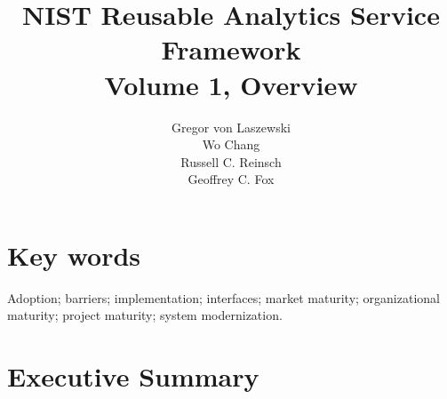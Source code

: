 \documentclass[12pt,fullpage]{article}
\newcommand{\TITLE}{NIST Reusable Analytics Service Framework\\
Volume 1, Overview}
\newcommand{\AUTHORS}{
\large Gregor von Laszewski\\
\large Wo Chang\\
\large Russell C. Reinsch\\
\large Geoffrey C. Fox\\
}
\begin{document}
% 

\title{\TITLE}
\author{\AUTHORS}
\maketitle






\section*{Key words}
\normalsize 

Adoption; barriers; implementation; interfaces; market maturity;
organizational maturity; project maturity; system modernization.\\

\pagebreak
\tableofcontents 
	
\listoftables

\listoffigures

\pagebreak

%
%






\section{Executive Summary}





\newpage




\end{document}
